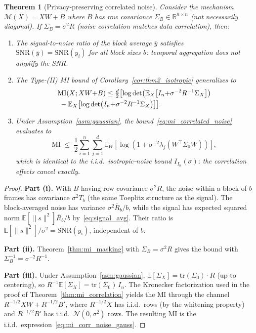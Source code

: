 \documentclass[letterpaper]{article} %
\newtheorem{theorem}{Theorem}
\newcommand{\MI}{\mathrm{MI}}
\begin{document}
\begin{theorem}[Privacy-preserving correlated noise]
\label{thm:correlated_noise}
Consider the mechanism $\mathcal{M}(X) = XW + B$ where $B$ has
row covariance $\Sigma_B \in \mathbb{R}^{n \times n}$ (not
necessarily diagonal).  If $\Sigma_B = \sigma^2 R$ (noise
correlation matches data correlation), then:

\begin{enumerate}[label=(\roman*)]
\item The signal-to-noise ratio of the block average $\bar{y}$
satisfies $\mathrm{SNR}(\bar{y}) = \mathrm{SNR}(y_i)$ for all
block sizes $b$: temporal aggregation does not amplify the SNR.

\item The Type-(II) MI bound of
Corollary~\ref{cor:thm2_isotropic} generalizes to
\begin{align}
\label{eq:mi_correlated_noise}
&\MI(X; XW{+}B) \le
\tfrac{d}{2}\bigl[
\log\det\bigl(\mathbb{E}_X\bigl[
I_n {+} \sigma^{-2}R^{-1}\Sigma_X
\bigr]\bigr) \notag \\
&\;{}- \mathbb{E}_X\bigl[
\log\det\bigl(
I_n {+} \sigma^{-2}R^{-1}\Sigma_X
\bigr)
\bigr]
\bigr].
\end{align}

\item Under Assumption~\ref{asm:gaussian}, the bound~\eqref{eq:mi_correlated_noise} evaluates to
\begin{equation}
\label{eq:mi_corr_noise_gauss}
\MI \;\le\; \frac{1}{2}\sum_{i=1}^n \sum_{j=1}^d \mathbb{E}_W\!\left[
\log\!\left(1 + \sigma^{-2}\lambda_j(W^\top\!\Sigma_0 W)\right)
\right],
\end{equation}
which is identical to the i.i.d.\ isotropic-noise bound
$I_{I_n}(\sigma)$: the correlation effects cancel exactly.
\end{enumerate}
\end{theorem}

\begin{proof}
\textbf{Part (i).}
With $B$ having row covariance $\sigma^2 R$, the noise within a
block of $b$ frames has covariance
$\sigma^2 T_b$ (the same Toeplitz structure as the signal).
The block-averaged noise has variance
$\sigma^2 \bar{R}_b / b$, while the signal has expected squared
norm $\mathbb{E}[\|s\|^2]\bar{R}_b/b$ by~\eqref{eq:signal_avg}.
Their ratio is $\mathbb{E}[\|s\|^2]/\sigma^2 = \mathrm{SNR}(y_i)$,
independent of $b$.

\textbf{Part (ii).}
Theorem~\ref{thm:mi_masking} with $\Sigma_B = \sigma^2 R$
gives the bound with $\Sigma_B^{-1} = \sigma^{-2}R^{-1}$.

\textbf{Part (iii).}
Under Assumption~\ref{asm:gaussian},
$\mathbb{E}[\Sigma_X] = \mathrm{tr}(\Sigma_0) \cdot R$ (up
to centering), so
$R^{-1}\mathbb{E}[\Sigma_X] = \mathrm{tr}(\Sigma_0)\,I_n$.
The Kronecker factorization used in the proof of
Theorem~\ref{thm:mi_correlation} yields the MI through the
channel $R^{-1/2}XW + R^{-1/2}B'$, where $R^{-1/2}X$ has
i.i.d.\ rows (by the whitening property) and $R^{-1/2}B'$ has
i.i.d.\ $\mathcal{N}(0,\sigma^2)$ rows.  The resulting MI is
the i.i.d.\ expression~\eqref{eq:mi_corr_noise_gauss}.
\end{proof}
\end{document}
